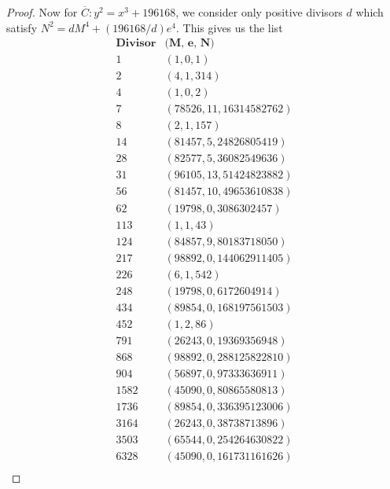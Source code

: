 \documentclass[12pt]{article}
\theoremstyle{definition}
\begin{document}
\begin{proof}
	Now for $\overline{C}: y^2 = x^3 + 196168$, we consider only positive divisors $d$ which satisfy $N^2 = dM^4 + (196168/d)e^4$.
	This gives us the list \begin{equation*}
		\begin{array}{r|c}
			\textbf{Divisor} & \textbf{(M, e, N)}        \\
			\hline
			1                & (1, 0, 1)                 \\
			2                & (4, 1, 314)               \\
			4                & (1, 0, 2)                 \\
			7                & (78526, 11, 16314582762)  \\
			8                & (2, 1, 157)               \\
			14               & (81457, 5, 24826805419)   \\
			28               & (82577, 5, 36082549636)   \\
			31               & (96105, 13, 51424823882)  \\
			56               & (81457, 10, 49653610838)  \\
			62               & (19798, 0, 3086302457)    \\
			113              & (1, 1, 43)                \\
			124              & (84857, 9, 80183718050)   \\
			217              & (98892, 0, 144062911405)  \\
			226              & (6, 1, 542)               \\
			248              & (19798, 0, 6172604914)    \\
			434              & (89854, 0, 168197561503)  \\
			452              & (1, 2, 86)                \\
			791              & (26243, 0, 19369356948)   \\
			868              & (98892, 0, 288125822810)  \\
			904              & (56897, 0, 97333636911)   \\
			1582             & (45090, 0, 80865580813)   \\
			1736             & (89854, 0, 336395123006)  \\
			3164             & (26243, 0, 38738713896)   \\
			3503             & (65544, 0, 254264630822)  \\
			6328             & (45090, 0, 161731161626)  \\

\end{array}
\end{equation*}
\end{proof}
\end{document}

